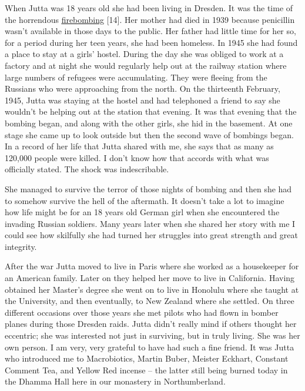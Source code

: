 When Jutta was 18 years old she had been living in Dresden. It was the
time of the horrendous
\href{https://www.history.com/this-day-in-history/firebombing-of-dresden}{\underline{firebombing}}
{[}14{]}. Her mother had died in 1939 because penicillin wasn't
available in those days to the public. Her father had little time for
her so, for a period during her teen years, she had been homeless. In
1945 she had found a place to stay at a girls' hostel. During the day
she was obliged to work at a factory and at night she would regularly
help out at the railway station where large numbers of refugees were
accumulating. They were fleeing from the Russians who were approaching
from the north. On the thirteenth February, 1945, Jutta was staying at
the hostel and had telephoned a friend to say she wouldn't be helping
out at the station that evening. It was that evening that the bombing
began, and along with the other girls, she hid in the basement. At one
stage she came up to look outside but then the second wave of bombings
began. In a record of her life that Jutta shared with me, she says that
as many as 120,000 people were killed. I don't know how that accords
with what was officially stated. The shock was indescribable.

She managed to survive the terror of those nights of bombing and then
she had to somehow survive the hell of the aftermath. It doesn't take a
lot to imagine how life might be for an 18 years old German girl when
she encountered the invading Russian soldiers. Many years later when she
shared her story with me I could see how skilfully she had turned her
struggles into great strength and great integrity.

After the war Jutta moved to live in Paris where she worked as a
housekeeper for an American family. Later on they helped her move to
live in California. Having obtained her Master's degree she went on to
live in Honolulu where she taught at the University, and then
eventually, to New Zealand where she settled. On three different
occasions over those years she met pilots who had flown in bomber planes
during those Dresden raids. Jutta didn't really mind if others thought
her eccentric; she was interested not just in surviving, but in truly
living. She was her own person. I am very, very grateful to have had
such a fine friend. It was Jutta who introduced me to Macrobiotics,
Martin Buber, Meister Eckhart, Constant Comment Tea, and Yellow Red
incense -- the latter still being burned today in the Dhamma Hall here
in our monastery in Northumberland.


